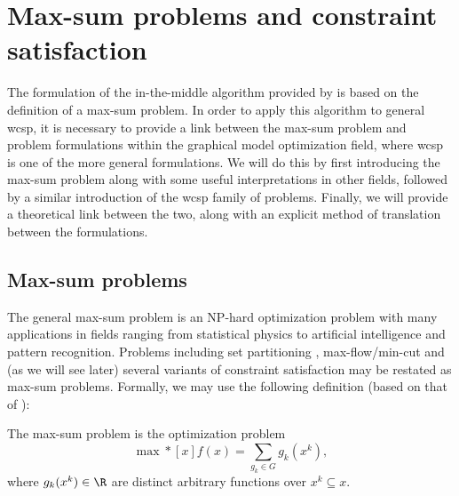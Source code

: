 \section{Max-sum problems and constraint satisfaction}
The formulation of the in-the-middle algorithm provided by \textcite{Wedelin08} is based on the definition of a max-sum problem.
In order to apply this algorithm to general \gls{wcsp}, it is necessary to provide a link between the max-sum problem and problem formulations within the graphical model optimization field, where \gls{wcsp} is one of the more general formulations.
We will do this by first introducing the max-sum problem along with some useful interpretations in other fields, followed by a similar introduction of the \gls{wcsp} family of problems.
Finally, we will provide a theoretical link between the two, along with an explicit method of translation between the formulations.

\subsection{Max-sum problems}
The general max-sum problem is an NP-hard optimization problem with many applications in fields ranging from statistical physics to artificial intelligence and pattern recognition.
Problems including set partitioning \parencite[\pno~107]{Wedelin08}, max-flow/min-cut and (as we will see later) several variants of constraint satisfaction may be restated as max-sum problems.
Formally, we may use the following definition (based on that of \citeauthor{Wedelin08}):
\begin{definition} \label{def:max-sum}
	The max-sum problem is the optimization problem
	\begin{equation*}
		\max*[x] f(x) = \sum_{g_k\in G} g_k(x^k),
	\end{equation*}
	where \(g_k(x^k) \in \R\) are distinct arbitrary functions over \(x^k \subseteq x\).
\end{definition}

